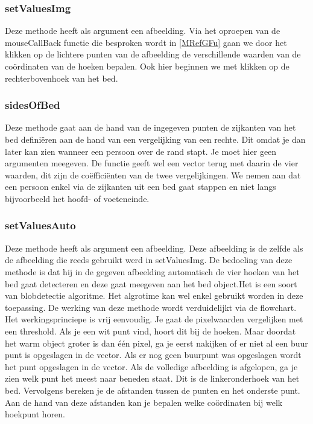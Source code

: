 \subsubsection{setValuesImg}
Deze methode heeft als argument een afbeelding. Via het oproepen van de mouseCallBack functie die besproken wordt in \ref{MRefGFu} gaan we door het klikken op de lichtere punten van de afbeelding de verschillende waarden van de co\"ordinaten van de hoeken bepalen. Ook hier beginnen we met klikken op de rechterbovenhoek van het bed. 

\subsubsection{sidesOfBed}
Deze methode gaat aan de hand van de ingegeven punten de zijkanten van het bed defini\"eren aan de hand van een vergelijking van een rechte. Dit omdat je dan later kan zien wanneer een persoon over de rand stapt. Je moet hier geen argumenten meegeven. De functie geeft wel een vector terug met daarin de vier waarden, dit zijn de co\"effici\"enten van de twee vergelijkingen. We nemen aan dat een persoon enkel via de zijkanten uit een bed gaat stappen en niet langs bijvoorbeeld het hoofd- of voeteneinde.

\subsubsection{setValuesAuto}
Deze methode heeft als argument een afbeelding. Deze afbeelding is de zelfde als de afbeelding die reeds gebruikt werd in setValuesImg. De bedoeling van deze methode is dat hij in de gegeven afbeelding automatisch de vier hoeken van het bed gaat detecteren en deze gaat meegeven aan het bed object.Het is een soort van blobdetectie algoritme. Het algrotime kan wel enkel gebruikt worden in deze toepassing. De werking van deze methode wordt verduidelijkt via de flowchart. Het werkingsprinciepe is vrij eenvoudig. Je gaat de pixelwaarden vergelijken met een threshold. Als je een wit punt vind, hoort dit bij de hoeken. Maar doordat het warm object groter is dan \'e\'en pixel, ga je eerst nakijken of er niet al een buur punt is opgeslagen in de vector. Als er nog geen buurpunt was opgeslagen wordt het punt opgeslagen in de vector. Als de volledige afbeelding is afgelopen, ga je zien welk punt het meest naar beneden staat. Dit is de linkeronderhoek van het bed. Vervolgens bereken je de afstanden tussen de punten en het onderste punt. Aan de hand van deze afstanden kan je bepalen welke co\"ordinaten bij welk hoekpunt horen.

